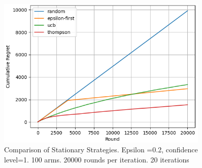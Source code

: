 %

\begin{figure}[h]
    \centering
    \includegraphics[width=0.9\textwidth]{figures/100machines}
    \caption[Comparison for 100 arms]{Comparison of Stationary Strategies. Epsilon =0.2, confidence level=1. 100 arms. 20000 rounds per iteration. 20 iterations}
    \label{fig: all4}
\end{figure}